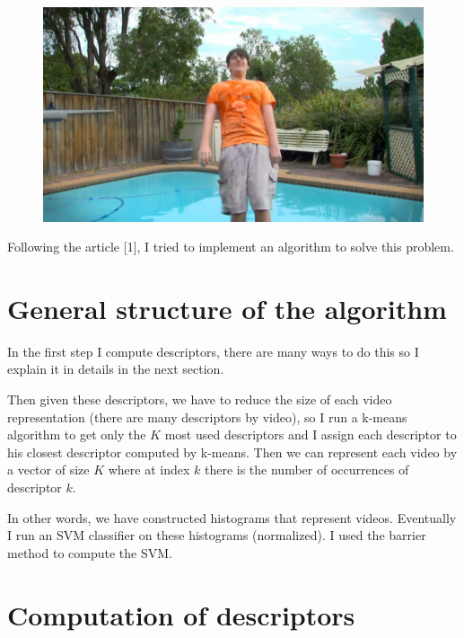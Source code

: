 \documentclass[10pt,a4paper]{report}
\begin{document}
\begin{figure}[h]
\begin{minipage}[b]{0.30\linewidth}
		\end{minipage}
		\hspace{5pt}
		\begin{minipage}[b]{0.30\linewidth}
			\includegraphics[width=1.0\textwidth]{im50.jpeg}
		\end{minipage}
		\label{fig:f}
	\end{figure}
	
	\hspace{-15pt}Following the article [1], I tried to implement an algorithm to solve this problem.
	
	\section*{General structure of the algorithm}
	
		In the first step I compute descriptors, there are many ways to do this so I explain it in details in the next section.
		
		Then given these descriptors, we have to reduce the size of each video representation (there are many descriptors by video), so I run a k-means algorithm to get only the $K$ most used descriptors and I assign each descriptor to his closest descriptor computed by k-means. Then we can represent each video by a vector of size $K$ where at index $k$ there is the number of occurrences of descriptor $k$.
		
		In other words, we have constructed histograms that represent videos. Eventually I run an SVM classifier on these histograms (normalized). I used the barrier method to compute the SVM.
	
		\section*{Computation of descriptors}
		
\end{document}

